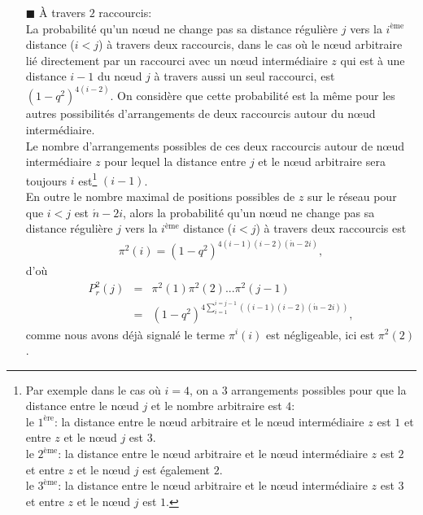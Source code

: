 \begin{itemize}
\item[$\blacksquare$]  \`{A} travers $2$ raccourcis: \\
La probabilité qu'un nœud ne change pas sa distance régulière $j$ vers la $i^{\text{ème}}$ distance ($i<j$) à travers deux raccourcis, dans
le cas où le nœud arbitraire lié directement par un raccourci avec un nœud intermédiaire $z$ qui est à une distance $i-1$ du
nœud $j$ à travers aussi un seul raccourci, est $(1-q^2)^{4(i-2)}$. On considère que cette probabilité est la m\^{e}me
pour les autres possibilités d'arrangements de deux  raccourcis autour du nœud intermédiaire.\\ Le nombre d'arrangements possibles de ces deux raccourcis autour de nœud intermédiaire $z$ pour lequel la distance entre $j$ et le nœud arbitraire sera toujours $i$ est\footnote{Par exemple dans le cas où $i=4$, on a $3$ arrangements possibles pour que la distance entre le nœud $j$ et le nombre arbitraire est $4$:\\ le $1^{\text{ère}}$: la distance entre le nœud arbitraire et le nœud intermédiaire $z$ est $1$ et entre $z$ et le nœud $j$ est $3$.\\ le $2^{\text{ème}}$: la distance entre le nœud arbitraire et le nœud intermédiaire $z$ est $2$ et entre $z$ et le nœud $j$ est également $2$.\\ le $3^{\text{ème}}$: la distance entre le nœud arbitraire et le nœud intermédiaire $z$ est $3$ et entre $z$ et le nœud $j$ est $1$.}  $(i-1)$.\\
En outre le nombre maximal de positions possibles de $z$ sur le réseau pour que $i<j$ est
$\acute{n}-2i$, alors la probabilité qu'un nœud ne change pas sa distance régulière $j$ vers
la $i^{\text{ème}}$ distance ($i<j$) à travers deux raccourcis est
\begin{eqnarray}
	\pi^2(i)=(1-q^2)^{4(i-1)(i-2)(\acute{n}-2i)},\nonumber
\end{eqnarray}
d'où
\begin{eqnarray}
	P_r^2(j)&=&\pi^2(1)\pi^2(2)...\pi^2(j-1)\\\nonumber
	&=& (1-q^2)^{4\sum_{i=1}^{i=j-1}((i-1)(i-2)(\acute{n}-2i))},
\end{eqnarray}
comme nous avons déjà signalé le terme $\pi^i(i)$ est négligeable, ici est $\pi^2(2)$.\\
	

\end{itemize}
